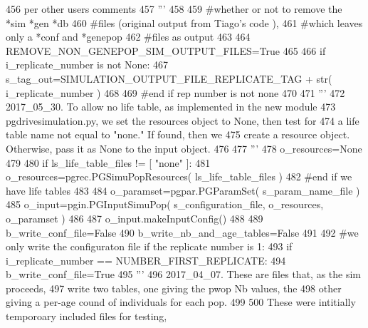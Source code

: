 \begin{DoxyCode}
456 \textcolor{stringliteral}{    per other users comments}
457 \textcolor{stringliteral}{    '''}
458 
459     \textcolor{comment}{#whether or not to remove the *sim *gen *db}
460     \textcolor{comment}{#files (original output from Tiago's code ), }
461     \textcolor{comment}{#which leaves only a *conf and *genepop}
462     \textcolor{comment}{#files as output}
463 
464     REMOVE\_NON\_GENEPOP\_SIM\_OUTPUT\_FILES=\textcolor{keyword}{True}
465 
466     \textcolor{keywordflow}{if} i\_replicate\_number \textcolor{keywordflow}{is} \textcolor{keywordflow}{not} \textcolor{keywordtype}{None}:
467         s\_tag\_out=SIMULATION\_OUTPUT\_FILE\_REPLICATE\_TAG + str( i\_replicate\_number )
468 
469     \textcolor{comment}{#end if rep number is not none}
470 
471     \textcolor{stringliteral}{'''}
472 \textcolor{stringliteral}{    2017\_05\_30.  To allow no life table, as implemented  in the new module}
473 \textcolor{stringliteral}{    pgdrivesimulation.py, we set the resources object to None, then test for }
474 \textcolor{stringliteral}{    a life table name not equal to "none."  If found, then we }
475 \textcolor{stringliteral}{    create a resource object.  Otherwise, pass it as None to the input object.}
476 \textcolor{stringliteral}{}
477 \textcolor{stringliteral}{    '''}
478     o\_resources=\textcolor{keywordtype}{None}
479 
480     \textcolor{keywordflow}{if} ls\_life\_table\_files != [ \textcolor{stringliteral}{"none"} ]:
481         o\_resources=pgrec.PGSimuPopResources( ls\_life\_table\_files )
482     \textcolor{comment}{#end if we have life tables}
483 
484     o\_paramset=pgpar.PGParamSet( s\_param\_name\_file )
485     o\_input=pgin.PGInputSimuPop( s\_configuration\_file, o\_resources, o\_paramset ) 
486     
487     o\_input.makeInputConfig()
488     
489     b\_write\_conf\_file=\textcolor{keyword}{False}
490     b\_write\_nb\_and\_age\_tables=\textcolor{keyword}{False}
491 
492     \textcolor{comment}{#we only write the configuraton file if the replicate number is 1:}
493     \textcolor{keywordflow}{if} i\_replicate\_number == NUMBER\_FIRST\_REPLICATE:
494         b\_write\_conf\_file=\textcolor{keyword}{True}
495         \textcolor{stringliteral}{'''}
496 \textcolor{stringliteral}{        2017\_04\_07.  These are files that, as the sim proceeds,}
497 \textcolor{stringliteral}{        write two tables, one giving the pwop Nb values, the }
498 \textcolor{stringliteral}{        other giving a per-age cound of individuals for each pop.}
499 \textcolor{stringliteral}{}
500 \textcolor{stringliteral}{        These were intitially temporoary included files for testing,}

\end{DoxyCode}
